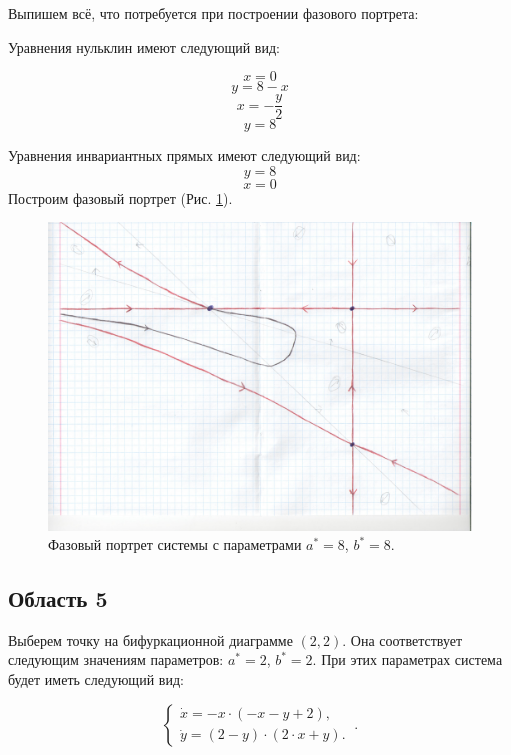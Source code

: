 Выпишем всё, что потребуется при построении фазового портрета:

Уравнения нульклин имеют следующий вид: 

$$x=0$$
$$y=8 - x$$
$$x=- \frac{y}{2}$$
$$y=8$$


Уравнения инвариантных прямых имеют следующий вид: 
$$y = 8$$
$$x = 0$$
Построим фазовый портрет (Рис. \ref{fig:phportr4}).

\begin{figure}[h]
	
	\includegraphics[width=\textwidth]{phptr/(8, 4) транскритическая.jpg}
	\centering
	\caption{\label{fig:phportr4} Фазовый портрет системы с параметрами $a^\ast = 8$, $b^\ast = 8$.}
	
\end{figure}

\subsection{Область 5}

Выберем точку на бифуркационной диаграмме $(2, 2)$. Она соответствует следующим значениям параметров:  $a^\ast = 2$, $b^\ast = 2$. При этих параметрах система будет иметь следующий вид: 

$$
\left \lbrace 
\begin{matrix} 
	\dot{x} = -x \cdot (-x - y + 2), \\
	\dot{y} = (2 - y) \cdot (2 \cdot x + y). \
\end{matrix} 
\right . .$$


